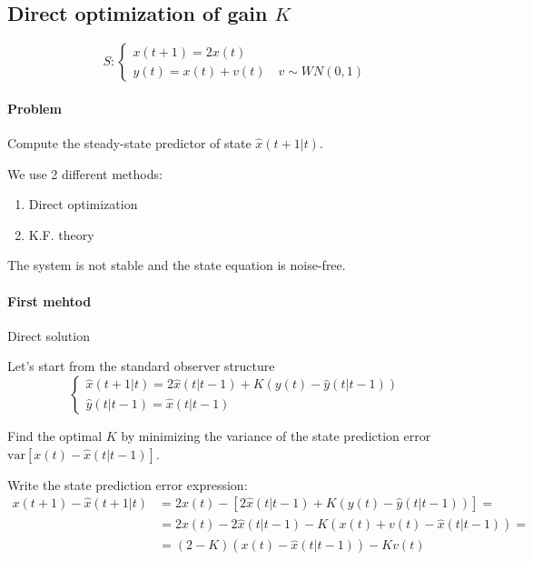 
\subsection{Direct optimization of gain $K$}
\[
    S: \begin{cases}
        x(t+1) = 2x(t) \\
        y(t) = x(t) + v(t) \quad v \sim WN(0, 1)
    \end{cases}
\]

\paragraph{Problem} Compute the steady-state predictor of state $\hat{x}(t+1|t)$.

We use 2 different methods:
\begin{enumerate}
    \item Direct optimization
    \item K.F. theory
\end{enumerate}

\begin{remark}
    The system is not stable and the state equation is noise-free.
\end{remark}

\paragraph{First mehtod} Direct solution

Let's start from the standard observer structure
\[
    \begin{cases}
        \hat{x}(t+1|t) = 2\hat{x}(t|t-1) + K(y(t) - \hat{y}(t|t-1)) \\
        \hat{y}(t|t-1) = \hat{x}(t|t-1)
    \end{cases}
\]

Find the optimal $K$ by minimizing the variance of the state prediction error $\text{var}\left[x(t)-\hat{x}(t|t-1)\right]$.

Write the state prediction error expression:
\begin{align*}
    x(t+1) - \hat{x}(t+1|t) &= 2x(t) - \left[ 2\hat{x}(t|t-1) + K (y(t) - \hat{y}(t|t-1)) \right] =\\
    &= 2x(t) - 2\hat{x}(t|t-1) - K(x(t) + v(t) - \hat{x}(t|t-1)) = \\
    &= (2-K)(x(t) - \hat{x}(t|t-1)) - Kv(t)
\end{align*}

